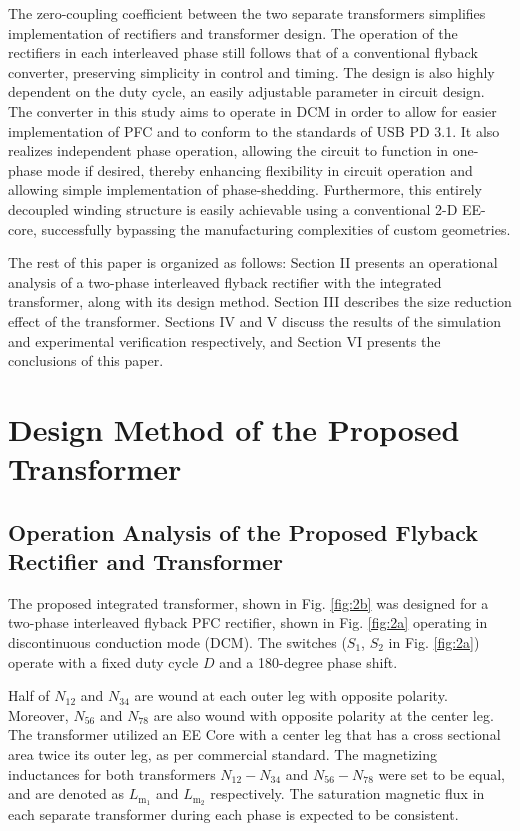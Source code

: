 \documentclass[lettersize,journal]{IEEEtran}
\begin{document}
The zero-coupling coefficient between the two separate transformers simplifies implementation of rectifiers and transformer design. The operation of the rectifiers in each interleaved phase still follows that of a conventional flyback converter, preserving simplicity in control and timing. The design is also highly dependent on the duty cycle, an easily adjustable parameter in circuit design. The converter in this study aims to operate in DCM in order to allow for easier implementation of PFC and to conform to the standards of USB PD 3.1. It also realizes independent phase operation, allowing the circuit to function in one-phase mode if desired, thereby enhancing flexibility in circuit operation and allowing simple implementation of phase-shedding. Furthermore, this entirely decoupled winding structure is easily achievable using a conventional 2-D EE-core, successfully bypassing the manufacturing complexities of custom geometries.

The rest of this paper is organized as follows: Section II presents an operational analysis of a two-phase interleaved flyback rectifier with the integrated transformer, along with its design method. Section III describes the size reduction effect of the transformer. Sections IV and V discuss the results of the simulation and experimental verification respectively, and Section VI presents the conclusions of this paper.

\section{Design Method of the Proposed Transformer}

\subsection{Operation Analysis of the Proposed Flyback Rectifier and Transformer}
The proposed integrated transformer, shown in Fig. \ref{fig:2b} was designed for a two-phase interleaved flyback PFC rectifier, shown in Fig. \ref{fig:2a} operating in discontinuous conduction mode (DCM). The switches ($S_1$, $S_2$ in Fig. \ref{fig:2a}) operate with a fixed duty cycle $D$ and a 180-degree phase shift.

Half of $N_{12}$ and $N_{34}$ are wound at each outer leg with opposite polarity. Moreover, $N_{56}$ and $N_{78}$ are also wound with opposite polarity at the center leg. The transformer utilized an EE Core with a center leg that has a cross sectional area twice its outer leg, as per commercial standard. The magnetizing inductances for both transformers $N_{12}-N_{34}$ and $N_{56}-N_{78}$ were set to be equal, and are denoted as $L_{\mathrm{m}_1}$ and $L_{\mathrm{m}_2}$ respectively. The saturation magnetic flux in each separate transformer during each phase is expected to be consistent.
\end{document}
